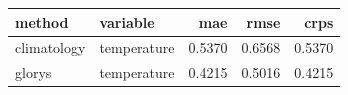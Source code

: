 \begin{tabular}{llrrr}
\toprule
method & variable & mae & rmse & crps \\
\midrule
climatology & temperature & 0.5370 & 0.6568 & 0.5370 \\
glorys & temperature & 0.4215 & 0.5016 & 0.4215 \\
\bottomrule
\end{tabular}
